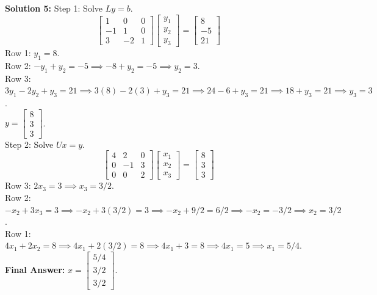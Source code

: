 \documentclass[11pt]{article}
\begin{document}
\vspace{0.5cm}
\textbf{Solution 5:}
Step 1: Solve $Ly = b$.
$$ \begin{bmatrix} 1 & 0 & 0 \\ -1 & 1 & 0 \\ 3 & -2 & 1 \end{bmatrix} \begin{bmatrix} y_1 \\ y_2 \\ y_3 \end{bmatrix} = \begin{bmatrix} 8 \\ -5 \\ 21 \end{bmatrix} $$
Row 1: $y_1 = 8$. \\
Row 2: $-y_1 + y_2 = -5 \implies -8 + y_2 = -5 \implies y_2 = 3$. \\
Row 3: $3y_1 - 2y_2 + y_3 = 21 \implies 3(8) - 2(3) + y_3 = 21 \implies 24 - 6 + y_3 = 21 \implies 18 + y_3 = 21 \implies y_3 = 3$. \\
$y = \begin{bmatrix} 8 \\ 3 \\ 3 \end{bmatrix}$. \\
Step 2: Solve $Ux = y$.
$$ \begin{bmatrix} 4 & 2 & 0 \\ 0 & -1 & 3 \\ 0 & 0 & 2 \end{bmatrix} \begin{bmatrix} x_1 \\ x_2 \\ x_3 \end{bmatrix} = \begin{bmatrix} 8 \\ 3 \\ 3 \end{bmatrix} $$
Row 3: $2x_3 = 3 \implies x_3 = 3/2$. \\
Row 2: $-x_2 + 3x_3 = 3 \implies -x_2 + 3(3/2) = 3 \implies -x_2 + 9/2 = 6/2 \implies -x_2 = -3/2 \implies x_2 = 3/2$. \\
Row 1: $4x_1 + 2x_2 = 8 \implies 4x_1 + 2(3/2) = 8 \implies 4x_1 + 3 = 8 \implies 4x_1 = 5 \implies x_1 = 5/4$. \\
\textbf{Final Answer:} $x = \begin{bmatrix} 5/4 \\ 3/2 \\ 3/2 \end{bmatrix}$.
\end{document}
